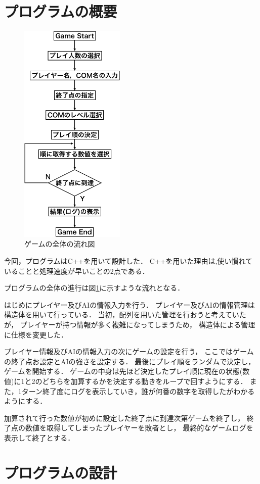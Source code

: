 \documentclass[a4paper,10pt]{jsarticle}
\begin{document}
\section{プログラムの概要}
\begin{figure}
  \centering
  \includegraphics[width=50mm]{./image/Over_Flow.png}
  \caption{ゲームの全体の流れ図}
  \label{fig:over}
\end{figure}
今回，プログラムはC++を用いて設計した．
C++を用いた理由は,使い慣れていることと処理速度が早いことの2点である．\par
プログラムの全体の進行は図\ref{fig:over}に示すような流れとなる．\par
はじめにプレイヤー及びAIの情報入力を行う．
プレイヤー及びAIの情報管理は構造体を用いて行っている．
当初，配列を用いた管理を行おうと考えていたが，
プレイヤーが持つ情報が多く複雑になってしまうため，
構造体による管理に仕様を変更した． \par
プレイヤー情報及びAIの情報入力の次にゲームの設定を行う，
ここではゲームの終了点お設定とAIの強さを設定する．
最後にプレイ順をランダムで決定し，ゲームを開始する．
ゲームの中身は先ほど決定したプレイ順に現在の状態(数値)に1と2のどちらを加算するかを決定する動きをループで回すようにする．
また，1ターン終了度にログを表示していき，誰が何番の数字を取得したがわかるようにする． \par
加算されて行った数値が初めに設定した終了点に到達次第ゲームを終了し，
終了点の数値を取得してしまったプレイヤーを敗者とし，
最終的なゲームログを表示して終了とする．

\section{プログラムの設計}
\end{document}
